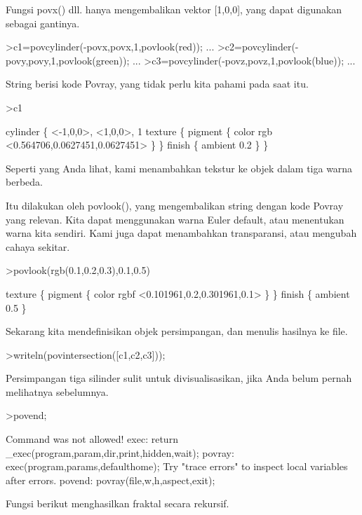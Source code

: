 \documentclass{article}
\begin{document}
\begin{eulernotebook}
\begin{eulercomment}
\begin{eulercomment}
\begin{eulercomment}
Fungsi povx() dll. hanya mengembalikan vektor [1,0,0], yang dapat
digunakan sebagai gantinya.
\end{eulercomment}
\begin{eulerprompt}
>c1=povcylinder(-povx,povx,1,povlook(red)); ...
>c2=povcylinder(-povy,povy,1,povlook(green)); ...
>c3=povcylinder(-povz,povz,1,povlook(blue)); ...
\end{eulerprompt}
\begin{eulercomment}
String berisi kode Povray, yang tidak perlu kita pahami pada saat itu.
\end{eulercomment}
\begin{eulerprompt}
>c1
\end{eulerprompt}
\begin{euleroutput}
  cylinder \{ <-1,0,0>, <1,0,0>, 1
   texture \{ pigment \{ color rgb <0.564706,0.0627451,0.0627451> \}  \} 
   finish \{ ambient 0.2 \} 
   \}
\end{euleroutput}
\begin{eulercomment}
Seperti yang Anda lihat, kami menambahkan tekstur ke objek dalam tiga
warna berbeda.

Itu dilakukan oleh povlook(), yang mengembalikan string dengan kode
Povray yang relevan. Kita dapat menggunakan warna Euler default, atau
menentukan warna kita sendiri. Kami juga dapat menambahkan
transparansi, atau mengubah cahaya sekitar.
\end{eulercomment}
\begin{eulerprompt}
>povlook(rgb(0.1,0.2,0.3),0.1,0.5)
\end{eulerprompt}
\begin{euleroutput}
   texture \{ pigment \{ color rgbf <0.101961,0.2,0.301961,0.1> \}  \} 
   finish \{ ambient 0.5 \} 
  
\end{euleroutput}
\begin{eulercomment}
Sekarang kita mendefinisikan objek persimpangan, dan menulis hasilnya
ke file.
\end{eulercomment}
\begin{eulerprompt}
>writeln(povintersection([c1,c2,c3]));
\end{eulerprompt}
\begin{eulercomment}
Persimpangan tiga silinder sulit untuk divisualisasikan, jika Anda
belum pernah melihatnya sebelumnya.
\end{eulercomment}
\begin{eulerprompt}
>povend;
\end{eulerprompt}
\begin{euleroutput}
  Command was not allowed!
  exec:
      return _exec(program,param,dir,print,hidden,wait);
  povray:
      exec(program,params,defaulthome);
  Try "trace errors" to inspect local variables after errors.
  povend:
      povray(file,w,h,aspect,exit); 
\end{euleroutput}
\begin{eulercomment}
Fungsi berikut menghasilkan fraktal secara rekursif.


\end{eulercomment}
\end{eulercomment}
\end{eulercomment}
\end{eulernotebook}
\end{document}
